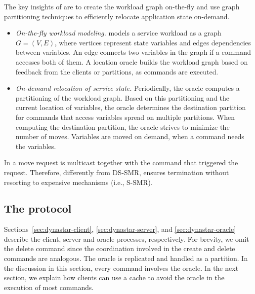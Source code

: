 The key insights of \dynastar are to create the workload graph on-the-fly and
use graph partitioning techniques to efficiently relocate application state
on-demand.
\begin{itemize}
\item \emph{On-the-fly workload modeling.}
\dynastar models a service workload as a graph $G = (V, E)$, where vertices
represent state variables and edges dependencies between variables. An edge
connects two variables in the graph if a command accesses both of them. A
location oracle builds the workload graph based on feedback from the clients or
partitions, as commands are executed.
\item \emph{On-demand relocation of service state.}
Periodically, the oracle computes a partitioning of the workload graph. Based on
this partitioning and the current location of variables, the oracle determines
the destination partition for commands that access variables spread on multiple
partitions. When computing the destination partition, the oracle strives to
minimize the number of moves. Variables are moved on demand, when a command
needs the variables.
\end{itemize}

In \dynastar a move request is multicast together with the command that
triggered the request.
Therefore, differently from DS-SMR, \dynastar ensures termination without
resorting to expensive mechanisms (i.e., S-SMR).


\subsection{The \dynastar protocol}
\setcounter{secnumdepth}{3}
Sections~\ref{sec:dynastar-client}, \ref{sec:dynastar-server}, and
\ref{sec:dynastar-oracle} describe the client, server and oracle processes,
respectively. For brevity, we omit the delete command since the coordination
involved in the create and delete commands are analogous. The oracle is
replicated and handled as a partition. In the discussion in this section, every
command involves the oracle. In the next section, we explain how clients can use
a cache to avoid the oracle in the execution of most commands.

